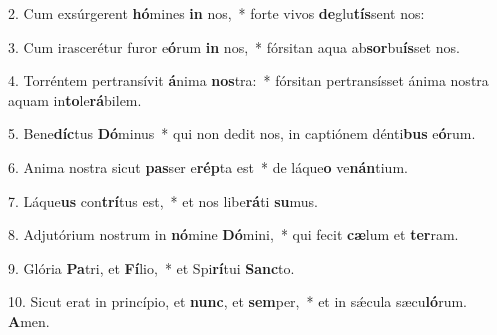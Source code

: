 2. Cum exsúrgerent \textbf{hó}mines \textbf{in} nos,~*  forte vivos \textbf{de}glu\textbf{tís}sent nos:\

3. Cum irascerétur furor e\textbf{ó}rum \textbf{in} nos,~*  fórsitan aqua ab\textbf{sor}bu\textbf{ís}set nos.\

4. Torréntem pertransívit \textbf{á}nima \textbf{nos}tra:~*  fórsitan pertransísset ánima nostra aquam in\textbf{to}le\textbf{rá}bilem.\

5. Bene\textbf{díc}tus \textbf{Dó}minus~*  qui non dedit nos, in captiónem dénti\textbf{bus} e\textbf{ó}rum.\

6. Anima nostra sicut \textbf{pas}ser e\textbf{rép}ta est~*  de láque\textbf{o} ve\textbf{nán}tium.\

7. Láque\textbf{us} con\textbf{trí}tus est,~*  et nos libe\textbf{rá}ti \textbf{su}mus.\

8. Adjutórium nostrum in \textbf{nó}mine \textbf{Dó}mini,~*  qui fecit \textbf{cæ}lum et \textbf{ter}ram.\

9. Glória \textbf{Pa}tri, et \textbf{Fí}lio,~*  et Spi\textbf{rí}tui \textbf{Sanc}to.\

10. Sicut erat in princípio, et \textbf{nunc}, et \textbf{sem}per,~*  et in sǽcula sæcu\textbf{ló}rum. \textbf{A}men.\

